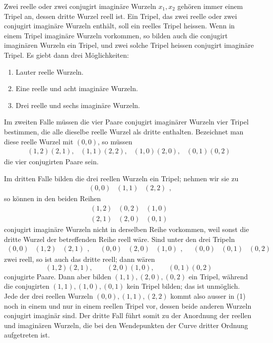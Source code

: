 \documentclass[11pt]{article}
\providecommand{\trip}[3]{\begin{array}{ccc}#1&#2&#3\end{array}}
\begin{document}
Zwei reelle oder zwei conjugirt imaginäre Wurzeln \(x_1,x_2\) gehören immer einem Tripel an, dessen dritte Wurzel reell ist. Ein Tripel, das zwei reelle oder zwei conjugirt imaginäre Wurzeln enthält, soll ein reelles Tripel heissen. Wenn in einem Tripel imaginäre Wurzeln vorkommen, so bilden auch die conjugirt imaginären Wurzeln ein Tripel, und zwei solche Tripel heissen conjugirt imaginäre Tripel. Es giebt dann drei Möglichkeiten:
\begin{enumerate}[label=\arabic*.]
\item Lauter reelle Wurzeln.
\item Eine reelle und acht imaginäre Wurzeln.
\item Drei reelle und sechs imaginäre Wurzeln.
\end{enumerate}

Im zweiten Falle müssen die vier Paare conjugirt imaginärer Wurzeln vier Tripel bestimmen, die alle dieselbe reelle Wurzel als dritte enthalten. Bezeichnet man diese reelle Wurzel mit \((0,0)\), so müssen
\[
\begin{array}{cccc}
(1,2)(2,1),&(1,1)(2,2),&(1,0)(2,0),&(0,1)(0,2)
\end{array}
\]
die vier conjugirten Paare sein.

Im dritten Falle bilden die drei reellen Wurzeln ein Tripel; nehmen wir sie zu
\begin{equation}
 \trip{(0,0)}{(1,1)}{(2,2)},
 \tag{1}
\end{equation}
so können in den beiden Reihen
\begin{equation}
\begin{array}{ccc}
(1,2)&(0,2)&(1,0)\\
(2,1)&(2,0)&(0,1)
\end{array}
\tag{2}
\end{equation}
conjugirt imaginäre Wurzeln nicht in derselben Reihe vorkommen, weil sonst die dritte Wurzel der betreffenden Reihe reell wäre. Sind unter den drei Tripeln
\[
\trip{(0,0)}{(1,2)}{(2,1)},
\quad
\trip{(0,0)}{(2,0)}{(1,0)},
\quad
\trip{(0,0)}{(0,1)}{(0,2)}
\]
zwei reell, so ist auch das dritte reell; dann wären
\[
(1,2)(2,1),
\qquad
(2,0)(1,0),
\qquad
(0,1)(0,2)
\]
conjugirte Paare. Dann aber bilden \((1,1),(2,0),(0,2)\) ein Tripel, während die conjugirten \((1,1),(1,0),(0,1)\) kein Tripel bilden; das ist unmöglich. Jede der drei reellen Wurzeln \((0,0),(1,1),(2,2)\) kommt also ausser in (1) noch in einem und nur in einem reellen Tripel vor, dessen beide anderen Wurzeln conjugirt imaginär sind. Der dritte Fall führt somit zu der Anordnung der reellen und imaginären Wurzeln, die bei den Wendepunkten der Curve dritter Ordnung aufgetreten ist.
\end{document}
